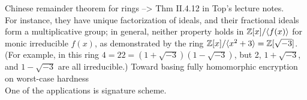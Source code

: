 Chinese remainder theorem for rings --> Thm II.4.12 in Top's lecture notes. \\
For instance, they have unique factorization of ideals, and their fractional ideals form a multiplicative group; in general, neither property holds in $\mathbb{Z}[x]/\langle f (x) \rangle$ for monic irreducible $f (x)$, as demonstrated by the ring $\mathbb{Z}[x]/\langle x^2+3 \rangle = \mathbb{Z}[\sqrt{-3}]$. (For example, in this ring $4 = 22 = (1+\sqrt{-3})(1 - \sqrt{-3})$, but 2, $1 + \sqrt{-3}$, and $1 - \sqrt{-3}$ are all irreducible.)
Toward basing fully homomorphic encryption on worst-case hardness \\
One of the applications is \cite{qTESLA} signature scheme.
